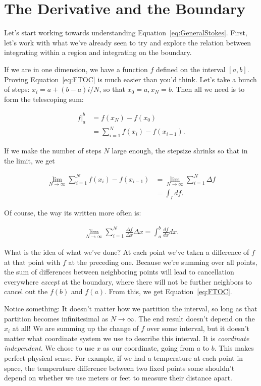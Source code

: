 \documentclass[../master.tex]{subfiles}
\begin{document}
\section{The Derivative and the Boundary}

	Let's start working towards understanding Equation~\eqref{eq:GeneralStokes}. First, let's work with what we've already seen to try and explore the relation between integrating within a region and integrating on the boundary. 
	
	If we are in one dimension, we have a function $f$ defined on the interval $[a,b]$. Proving Equation~\eqref{eq:FTOC} is much easier than you'd think. Let's take a bunch of steps: $x_i = a + (b-a)i/N$, so that $x_0 = a, x_N = b$. Then all we need is to form the telescoping sum:
	
	\begin{align*}
		f\rvert^b_a &= f(x_N) - f(x_0) \\& = \sum_{i=1}^N f(x_{i})-f(x_{i-1}).
	\end{align*}
	
	If we make the number of steps $N$ large enough, the stepsize shrinks so that in the limit, we get
	
	\begin{align*}
		\lim_{N \rightarrow \infty} 	\sum_{i=1}^N f(x_{i})-f(x_{i-1}) & = \lim_{N \rightarrow \infty} 	\sum_{i=1}^N \Delta f \\ & = \int_I df.
	\end{align*}
	
	Of course, the way its written more often is:

	\begin{align*}
		\lim_{N \rightarrow \infty} 	\sum_{i=1}^N \frac{\Delta f}{\Delta x} \Delta x  = \int_{a}^{b} \frac{df}{dx} dx.
	\end{align*}
	
	What is the idea of what we've done? At each point we've taken a difference of $f$ at that point with $f$ at the preceding one. Because we're summing over all points, the sum of differences between neighboring points will lead to cancellation everywhere \emph{except} at the boundary, where there will not be further neighbors to cancel out the $f(b)$ and $f(a)$. From this, we get Equation~\eqref{eq:FTOC}. 
	
	Notice something: It doesn't matter how we partition the interval, so long as that partition becomes infinitesimal as $N \rightarrow \infty$. The end result doesn't depend on the $x_i$ at all! We are summing up the change of $f$ over some interval, but it doesn't matter what coordinate system we use to describe this interval. It is \emph{coordinate independent}. We chose to use $x$ as our coordinate, going from $a$ to $b$. This makes perfect physical sense. For example, if we had a temperature at each point in space, the temperature difference between two fixed points some shouldn't depend on whether we use meters or feet to measure their distance apart.  
	
\end{document}
